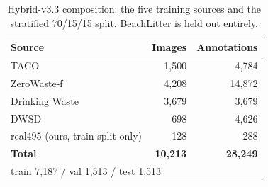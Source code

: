 \begin{table}[!tb]
\centering
\caption{Hybrid-v3.3 composition: the five training sources and the
stratified 70/15/15 split. BeachLitter is held out entirely.}
\label{tab:dataset}
\small
\setlength{\tabcolsep}{5pt}
\begin{tabular}{lrr}
\toprule
Source & Images & Annotations \\
\midrule
TACO~\cite{proenca2020taco}                & 1{,}500 & 4{,}784  \\
ZeroWaste-f~\cite{bashkirova2022zerowaste} & 4{,}208 & 14{,}872 \\
Drinking Waste~\cite{drinkingwaste2021}    & 3{,}679 & 3{,}679  \\
DWSD~\cite{dwsd2024}                       & 698     & 4{,}626  \\
real495 (ours, train split only)           & 128     & 288      \\
\midrule
\textbf{Total}  & \textbf{10{,}213} & \textbf{28{,}249} \\
\bottomrule
\multicolumn{3}{l}{\footnotesize train 7,187 / val 1,513 / test 1,513}
\end{tabular}
\end{table}
